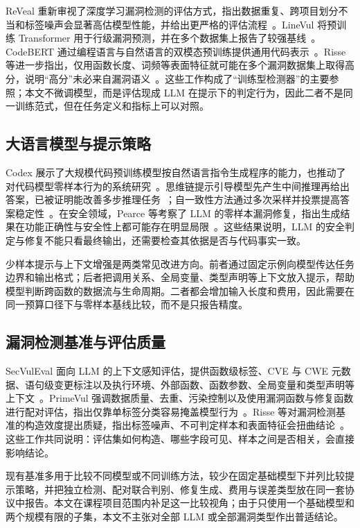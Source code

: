 \documentclass[conference]{IEEEtran}
\begin{document}
ReVeal 重新审视了深度学习漏洞检测的评估方式，指出数据重复、跨项目划分不当和标签噪声会显著高估模型性能，并给出更严格的评估流程~\cite{chakraborty2021reveal}。LineVul 将预训练 Transformer 用于行级漏洞预测，并在多个数据集上报告了较强基线~\cite{fu2022linevul}。CodeBERT 通过编程语言与自然语言的双模态预训练提供通用代码表示~\cite{feng2020codebert}。Risse 等进一步指出，仅用函数长度、词频等表面特征就可能在多个漏洞数据集上取得高分，说明“高分”未必来自漏洞语义~\cite{risse2024limits,risse2025topscore}。这些工作构成了“训练型检测器”的主要参照；本文不微调模型，而是评估现成 LLM 在提示下的判定行为，因此二者不是同一训练范式，但在任务定义和指标上可以对照。

\subsection{大语言模型与提示策略}
Codex 展示了大规模代码预训练模型按自然语言指令生成程序的能力，也推动了对代码模型零样本行为的系统研究~\cite{chen2021codex}。思维链提示引导模型先产生中间推理再给出答案，已被证明能改善多步推理任务~\cite{wei2022cot}；自一致性方法通过多次采样并投票提高答案稳定性~\cite{wang2023selfconsistency}。在安全领域，Pearce 等考察了 LLM 的零样本漏洞修复，指出生成结果在功能正确性与安全性上都可能存在明显局限~\cite{pearce2023zeroshot}。这些结果说明，LLM 的安全判定与修复不能只看最终输出，还需要检查其依据是否与代码事实一致。

少样本提示与上下文增强是两类常见改进方向。前者通过固定示例向模型传达任务边界和输出格式；后者把调用关系、全局变量、类型声明等上下文放入提示，帮助模型判断跨函数的数据流与生命周期。二者都会增加输入长度和费用，因此需要在同一预算口径下与零样本基线比较，而不是只报告精度。

\subsection{漏洞检测基准与评估质量}
SecVulEval 面向 LLM 的上下文感知评估，提供函数级标签、CVE 与 CWE 元数据、语句级变更标注以及执行环境、外部函数、函数参数、全局变量和类型声明等上下文~\cite{ahmed2026secvuleval,secvulevaldata}。PrimeVul 强调数据质量、去重、污染控制以及使用漏洞函数与修复函数进行配对评估，指出仅靠单标签分类容易掩盖模型行为~\cite{ding2025primevul}。Risse 等对漏洞检测基准的构造效度提出质疑，指出标签噪声、不可判定样本和表面特征会扭曲结论~\cite{risse2024limits,risse2025topscore}。这些工作共同说明：评估集如何构造、哪些字段可见、样本之间是否相关，会直接影响结论。

现有基准多用于比较不同模型或不同训练方法，较少在固定基础模型下并列比较提示策略，并把独立检测、配对联合判别、修复生成、费用与误差类型放在同一套协议中报告。本文在课程项目范围内补足这一比较视角；由于只使用一个基础模型和两个规模有限的子集，本文不主张对全部 LLM 或全部漏洞类型作出普适结论。
\end{document}
